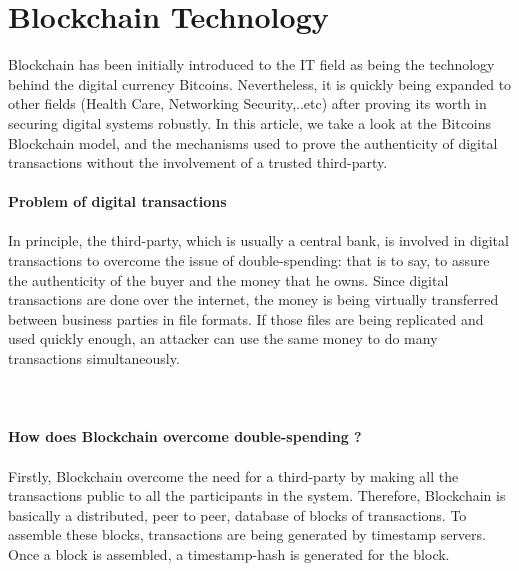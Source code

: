 \section{Blockchain Technology}
Blockchain has been initially introduced to the IT field as being the technology behind the digital currency Bitcoins. Nevertheless,  it is quickly being expanded to other fields (Health Care, Networking Security,..etc) after proving its worth in securing digital systems robustly. In this article, we take a look at the Bitcoins Blockchain model,  and the mechanisms used to prove the authenticity of digital transactions without the involvement of a trusted third-party.\\
\\
\textbf{\Large Problem of digital transactions}\\
\\
In principle, the third-party, which is usually a central bank, is involved in digital transactions to overcome the issue of double-spending: that is to say, to assure the authenticity of the buyer and the money that he owns. Since digital transactions are done over the internet, the money is being virtually transferred between business parties in file formats. If those files are being replicated and used quickly enough, an attacker can use the same money to do many transactions simultaneously.\\
\\
\\
\\
\textbf{\large How does Blockchain overcome double-spending ?}\\
\\
Firstly, Blockchain overcome the need for a third-party by making all the transactions public to all the participants in the system. Therefore, Blockchain is basically a distributed, peer to peer, database of blocks of transactions.  To assemble these blocks, transactions are being generated by timestamp servers. Once a block is assembled, a timestamp-hash is generated for the block.
\\
\\
